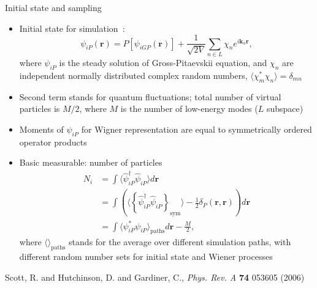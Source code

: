 \documentclass[final,hyperref={pdfpagelabels=false}]{beamer}
\begin{document}
\begin{frame}
\begin{columns}
{\begin{block}{Initial state and sampling}

\begin{itemize}
	\item Initial state for simulation~\cite{scott}:
\[
\psi_{iP}(\mathbf{r}) = P[\psi_{iGP}(\mathbf{r})] + \frac{1}{\sqrt{2V}} \sum\limits_{n \in L} \chi_n e^{i \mathbf{k}_n \mathbf{r}},
\]
		where $\psi_{iP}$ is the steady solution of Gross-Pitaevskii equation,
		and $\chi_n$ are independent normally distributed complex random numbers,
		$\langle \chi_m^* \chi_n \rangle = \delta_{mn}$
	\item Second term stands for quantum fluctuations; total number of virtual particles is $M/2$,
		where $M$ is the number of low-energy modes ($L$ subspace)
	\item Moments of $\psi_{iP}$ for Wigner representation are equal to symmetrically ordered operator products
	\item Basic measurable: number of particles
\begin{align*}
N_i & = \int \langle \hat{\psi}_{iP}^\dagger \hat{\psi}_{iP} \rangle d\mathbf{r} \\
& = \int \left( \langle \left\{ \hat{\psi}_{iP}^\dagger \hat{\psi}_{iP} \right\}_{\textrm{sym}} \rangle -
	\frac{1}{2} \delta_P(\mathbf{r}, \mathbf{r})  \right) d\mathbf{r} \\
& = \int \langle \psi_{iP}^* \psi_{iP} \rangle_{\textrm{paths}} d\mathbf{r} - \frac{M}{2},
\end{align*}
	where $\langle \rangle_{\textrm{paths}}$ stands for the average over different simulation paths,
	with different random number sets for initial state and Wiener processes

\end{itemize}

\tiny{ \begin{thebibliography}{9}
	 Scott, R. and Hutchinson, D. and Gardiner, C., \textit{Phys. Rev. A} \textbf{74} 053605 (2006)
\end{thebibliography} }
\end{block}

} %

\end{columns}
\end{frame}
\end{document}
